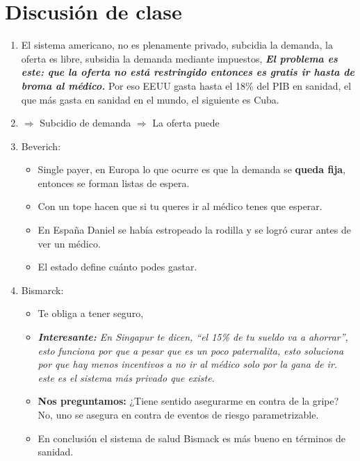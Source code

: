 \section{Discusión de clase}
\begin{enumerate}
    \item El sistema americano, no es plenamente privado, subcidia la demanda, la oferta es libre, subsidia la demanda mediante impuestos, \textbf{\emph{El problema es este: que la oferta no está restringido entonces es gratis ir hasta de broma al médico.}} Por eso EEUU gasta hasta el 18\% del PIB en sanidad, el que más gasta en sanidad en el mundo, el siguiente es Cuba.
    \item $\Rightarrow$ Subcidio de demanda $\Rightarrow$ La oferta puede 
    \item Beverich: 
        \begin{itemize}
            \item Single payer, en Europa lo que ocurre es que la demanda se \textbf{queda fija}, entonces se forman listas de espera.
            \item Con un tope hacen que si tu queres ir al médico tenes que esperar.
            \item En España Daniel se había estropeado la rodilla y se logró curar antes de ver un médico.
            \item El estado define cuánto podes gastar.
        \end{itemize}
    
    \item Bismarck: 
        \begin{itemize}
            \item Te obliga a tener seguro, 
            \item \emph{\textbf{Interesante:} En Singapur te dicen, ``el 15\% de tu sueldo va a ahorrar'', esto funciona por que a pesar que es un poco paternalita, esto soluciona por que hay menos incentivos a no ir al médico solo por la gana de ir. este es el sistema más privado que existe.}
            \item \textbf{Nos preguntamos:} ¿Tiene sentido asegurarme en contra de la gripe? No, uno se asegura en contra de eventos de riesgo parametrizable.
            \item En conclusión el sistema de salud Bismack es más bueno en términos de sanidad.
        \end{itemize}
\end{enumerate}

